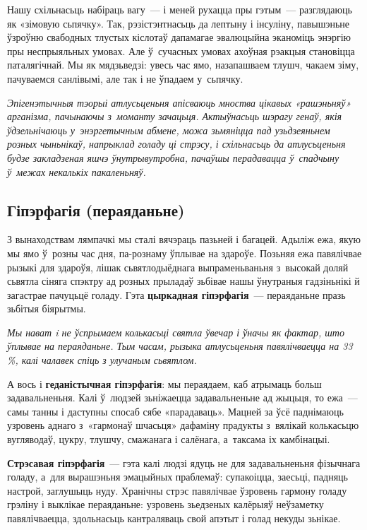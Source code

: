 
Нашу схільнасьць набіраць вагу~--- і меней рухацца пры гэтым~--- разглядаюць як «зімовую сьпячку». Так, рэзістэнтнасьць да лептыну і інсуліну, павышэньне ўзроўню свабодных тлустых кіслотаў дапамагае эвалюцыйна эканоміць энэргію пры неспрыяльных умовах. Але ў~сучасных умовах ахоўная рэакцыя становіцца паталягічнай. Мы як мядзьведзі: увесь час ямо, назапашваем тлушч, чакаем зіму, пачуваемся санлівымі, але так і не ўпадаем у~сьпячку.

\emph{Эпігенэтычныя тэорыі атлусьценьня апісваюць мноства цікавых «рашэньняў» арганізма, пачынаючы з~моманту зачацьця. Актыўнасьць шэрагу генаў, якія ўдзельнічаюць у~энэргетычным абмене, можа зьмяніцца пад узьдзеяньнем розных чыньнікаў, напрыклад голаду ці стрэсу, і схільнасьць да атлусьценьня будзе закладзеная яшчэ ўнутрывутробна, пачаўшы перадавацца ў~спадчыну ў~межах некалькіх пакаленьняў.}

\subsection*{Гіпэрфагія (пераяданьне)}

З вынаходствам лямпачкі мы сталі вячэраць пазьней і багацей. Адыліж ежа, якую мы ямо ў~розны час дня, па-рознаму ўплывае на здароўе. Позьняя ежа павялічвае рызыкі для здароўя, лішак сьвятлодыёднага выпраменьваньня з~высокай доляй сьвятла сіняга спэктру ад розных прыладаў зьбівае нашы ўнутраныя гадзіньнікі й загастрае пачуцьцё голаду. Гэта \textbf{цыркадная гіпэрфагія}~--- пераяданьне празь зьбітыя біярытмы.

\emph{Мы нават i не ўспрымаем колькасьці святла ўвечар і ўначы як фактар, што ўплывае на пераяданьне. Тым часам, рызыка атлусьценьня павялічваецца на 33\,\%, калі чалавек спіць з улучаным сьвятлом.}

А вось і \textbf{геданістычная гіпэрфагія}: мы пераядаем, каб атрымаць больш задавальненьня. Калі ў~людзей зьніжаецца задавальненьне ад жыцьця, то ежа~--- самы танны і даступны спосаб сябе «парадаваць». Мацней за ўсё паднімаюць узровень аднаго з~«гармонаў шчасьця» дафаміну прадукты з~вялікай колькасьцю вугляводаў, цукру, тлушчу, смажанага і салёнага, а~таксама іх камбінацыі.

\textbf{Стрэсавая гіпэрфагія}~--- гэта калі людзі ядуць не для задавальненьня фізычнага голаду, а~для вырашэньня эмацыйных праблемаў: супакоіцца, заесьці, падняць настрой, заглушыць нуду. Хранічны стрэс павялічвае ўзровень гармону голаду грэліну і выклікае пераяданьне: узровень зьедзеных калёрыяў неўзаметку павялічваецца, здольнасьць кантраляваць свой апэтыт і голад некуды зьнікае.

